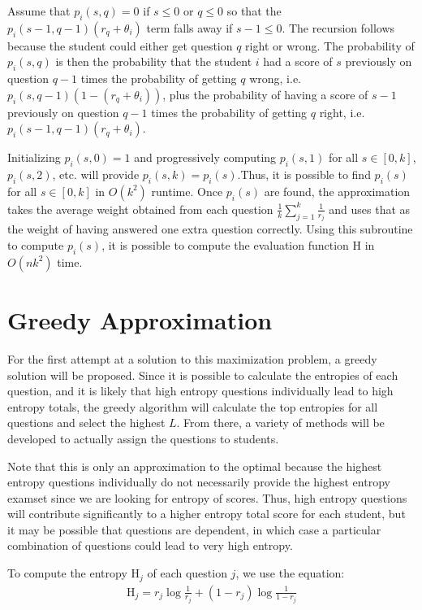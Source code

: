 \documentclass[psamsfonts]{amsart}
\begin{document}
Assume that $p_i(s,q) = 0$ if $s \leq 0$ or $q \leq 0$ so that the $p_i(s-1, q-1) (r_q + \theta_i)$ term falls away if $s-1 \leq 0$. The recursion follows because the student could either get question $q$ right or wrong. The probability of $p_i(s, q)$ is then the probability that the student $i$ had a score of $s$ previously on question $q-1$ times the probability of getting $q$ wrong, i.e. $p_i(s, q-1) (1 - (r_q + \theta_i))$, plus the probability of having a score of $s-1$ previously on question $q-1$ times the probability of getting $q$ right, i.e. $p_i(s-1, q-1) (r_q + \theta_i)$.

Initializing $p_i(s, 0) = 1$ and progressively computing $p_i(s, 1)$ for all $s \in [0,k]$, $p_i(s, 2)$, etc. will provide $p_i(s, k) = p_i(s)$.Thus, it is possible to find $p_i(s)$ for all $s \in [0,k]$ in $O(k^2)$ runtime. Once $p_i(s)$ are found, the approximation takes the average weight obtained from each question $\frac{1}{k} \sum_{j=1}^k \frac{1}{r_j}$ and uses that as the weight of having answered one extra question correctly. Using this subroutine to compute $p_i(s)$, it is possible to compute the evaluation function $\mathrm{H}$ in $O(n k^2)$ time. 

\section{Greedy Approximation}

For the first attempt at a solution to this maximization problem, a greedy solution will be proposed. Since it is possible to calculate the entropies of each question, and it is likely that high entropy questions individually lead to high entropy totals, the greedy algorithm will calculate the top entropies for all questions and select the highest $L$. From there, a variety of methods will be developed to actually assign the questions to students. 

Note that this is only an approximation to the optimal because the highest entropy questions individually do not necessarily provide the highest entropy examset since we are looking for entropy of scores. Thus, high entropy questions will contribute significantly to a higher entropy total score for each student, but it may be possible that questions are dependent, in which case a particular combination of questions could lead to very high entropy. 

To compute the entropy $\mathrm{H}_j$ of each question $j$, we use the equation:
\begin{eqnarray}
\mathrm{H}_j = r_j \log \frac{1}{r_j} + (1 - r_j) \log \frac{1}{1 - r_j}
\end{eqnarray}
\end{document}
